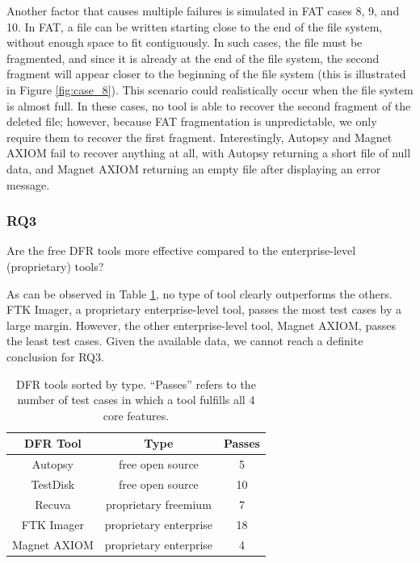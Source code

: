 Another factor that causes multiple failures is simulated in FAT cases 8, 9, and 10.
In FAT, a file can be written starting close to the end of the file system, without enough space to fit contiguously.
In such cases, the file must be fragmented, and since it is already at the end of the file system, the second fragment will appear closer to the beginning of the file system (this is illustrated in Figure \ref{fig:case_8}).
This scenario could realistically occur when the file system is almost full.
In these cases, no tool is able to recover the second fragment of the deleted file; however, because FAT fragmentation is unpredictable, we only require them to recover the first fragment.
Interestingly, Autopsy and Magnet AXIOM fail to recover anything at all, with Autopsy returning a short file of null data, and Magnet AXIOM returning an empty file after displaying an error message.

\subsubsection{RQ3}
Are the free DFR tools more effective compared to the enterprise-level (proprietary) tools?

As can be observed in Table \ref{table:results_table}, no type of tool clearly outperforms the others.
FTK Imager, a proprietary enterprise-level tool, passes the most test cases by a large margin.
However, the other enterprise-level tool, Magnet AXIOM, passes the least test cases.
Given the available data, we cannot reach a definite conclusion for RQ3.

\begin{table}[h!]
    \caption{DFR tools sorted by type. ``Passes'' refers to the number of test cases in which a tool fulfills all 4 core features.}
    \label{table:results_table}
    \begin{tabular}{| c | c | c |}
    \hline
    \textbf{DFR Tool} &  \textbf{Type} &  \textbf{Passes} \\ \hline
    Autopsy & free open source & 5 \\ \hline
    TestDisk & free open source & 10 \\ \hline
    Recuva & proprietary freemium & 7 \\ \hline
    FTK Imager & proprietary enterprise & 18 \\ \hline
    Magnet AXIOM & proprietary enterprise & 4 \\ \hline
    \end{tabular}
\end{table}    

